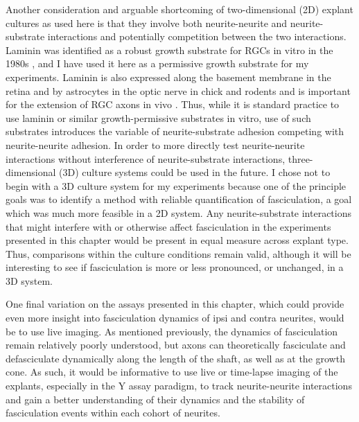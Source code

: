 Another consideration and arguable shortcoming of two-dimensional (2D) explant cultures as used here is that they involve both neurite-neurite and neurite-substrate interactions and potentially competition between the two interactions.
Laminin was identified as a robust growth substrate for RGCs in vitro in the 1980s \cite{smalheiser1984laminin,cohen1985retinal}, and I have used it here as a permissive growth substrate for my experiments.
Laminin is also expressed along the basement membrane in the retina and by astrocytes in the optic nerve in chick and rodents and is important for the extension of RGC axons in vivo \cite{cohen1987role,liesi1988astrocyte,sarthy1990localization,morissette1995laminin}.
Thus, while it is standard practice to use laminin or similar growth-permissive substrates in vitro, use of such substrates introduces the variable of neurite-substrate adhesion competing with neurite-neurite adhesion.
In order to more directly test neurite-neurite interactions without interference of neurite-substrate interactions, three-dimensional (3D) culture systems could be used in the future.
I chose not to begin with a 3D culture system for my experiments because one of the principle goals was to identify a method with reliable quantification of fasciculation, a goal which was much more feasible in a 2D system.
Any neurite-substrate interactions that might interfere with or otherwise affect fasciculation in the experiments presented in this chapter would be present in equal measure across explant type.
Thus, comparisons within the culture conditions remain valid, although it will be interesting to see if fasciculation is more or less pronounced, or unchanged, in a 3D system.

One final variation on the assays presented in this chapter, which could provide even more insight into fasciculation dynamics of ipsi and contra neurites, would be to use live imaging. 
As mentioned previously, the dynamics of fasciculation remain relatively poorly understood, but axons can theoretically fasciculate and defasciculate dynamically along the length of the shaft, as well as at the growth cone.
As such, it would be informative to use live or time-lapse imaging of the explants, especially in the Y assay paradigm, to track neurite-neurite interactions and gain a better understanding of their dynamics and the stability of fasciculation events within each cohort of neurites.